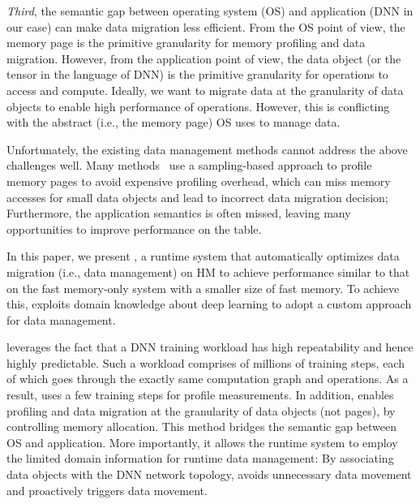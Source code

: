 \textit{Third}, the semantic gap between operating system (OS) and application (DNN in our case) can make data migration less efficient. From the OS point of view, the memory page is the primitive granularity for memory profiling and data migration. However, from the application point of view, the data object (or the tensor in the language of DNN) is the primitive granularity for operations to access and compute. Ideally, we want to migrate data at the granularity of data objects to enable high performance of operations. However, this is conflicting with the abstract (i.e., the memory page) OS uses to manage data. 

Unfortunately, the existing data management methods cannot address the above challenges well. Many methods~\cite{Thermostat:asplos17,RAMinate:socc16,heteros:isca17,sc18:wu,unimem:sc17} use a sampling-based approach to profile memory pages to \textcolor{dong2}{avoid expensive profiling overhead}, which can miss memory accesses for small data objects and lead to incorrect data migration decision; Furthermore, the application semantics is often missed, leaving many opportunities to improve performance on the table. 


In this paper, we present \textit{\name}, a runtime system that automatically optimizes data migration (i.e., data management) on HM to achieve performance similar to that on the fast memory-only system with a smaller size of fast memory. To achieve this, \name exploits domain knowledge about deep learning to adopt a custom approach for data management. %


\name leverages the fact that a DNN training workload has high repeatability and hence highly predictable. Such a workload comprises of millions of training steps, each of which goes through the exactly same computation graph and operations. As a result, \name uses a few training steps for profile measurements. In addition, \name enables profiling and data migration at the granularity of data objects (not pages), by controlling memory allocation. This method bridges the semantic gap between OS and application. More importantly, it allows the runtime system to employ the limited domain information for runtime data management: By associating data objects with the DNN network topology, \name avoids unnecessary data movement and proactively triggers data movement. 



